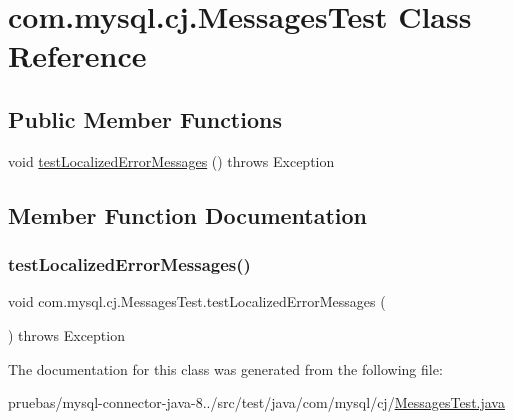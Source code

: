 \hypertarget{classcom_1_1mysql_1_1cj_1_1_messages_test}{}\section{com.\+mysql.\+cj.\+Messages\+Test Class Reference}
\label{classcom_1_1mysql_1_1cj_1_1_messages_test}
\subsection*{Public Member Functions}
\begin{DoxyCompactItemize}
\item 
void \mbox{\hyperlink{classcom_1_1mysql_1_1cj_1_1_messages_test_a36983c9f9c1b4bff069158e80769983f}{test\+Localized\+Error\+Messages}} ()  throws Exception 
\end{DoxyCompactItemize}


\subsection{Member Function Documentation}
\mbox{\label{classcom_1_1mysql_1_1cj_1_1_messages_test_a36983c9f9c1b4bff069158e80769983f}} 
\subsubsection{\texorpdfstring{test\+Localized\+Error\+Messages()}{testLocalizedErrorMessages()}}
{\footnotesize\ttfamily void com.\+mysql.\+cj.\+Messages\+Test.\+test\+Localized\+Error\+Messages (\begin{DoxyParamCaption}{ }\end{DoxyParamCaption}) throws Exception}



The documentation for this class was generated from the following file\+:\begin{DoxyCompactItemize}
\item 
pruebas/mysql-\/connector-\/java-\/8../src/test/java/com/mysql/cj/\mbox{\hyperlink{_messages_test_8java}{Messages\+Test.\+java}}\end{DoxyCompactItemize}

